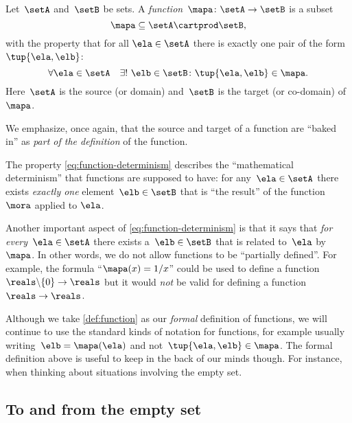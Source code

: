 \begin{ctdefinition}[Function]
    \label{def:function}
    Let~$\setA$ and~$\setB$ be sets.
    A \emph{function}~$\mapa\colon \setA \to \setB$ is a subset
    \begin{equation*}
        \mapa \subseteq \setA \cartprod \setB,
    \end{equation*}
    with the property that for all $\ela \in \setA$ there is exactly one pair of the form~$\tup{\ela,\elb}$:
    \begin{equation}
        \label{eq:function-determinism}
        \forall \ela \in \setA  \quad  \exists !
        \ \elb \in \setB \colon \tup{\ela,\elb} \in \mapa.
    \end{equation}
    Here~$\setA$ is the source (or domain) and~$\setB$ is the target (or co-domain) of~$\mapa$.
\end{ctdefinition}


We emphasize, once again, that the source and target of a function are ``baked in'' as \emph{part of the definition} of the function.

The property \cref{eq:function-determinism} describes the ``mathematical determinism'' that functions are supposed to have: for any~$\ela \in \setA$ there exists \emph{exactly one} element~$\elb \in \setB$ that is ``the result'' of the function $\mora$ applied to $\ela$.

Another important aspect of \cref{eq:function-determinism} is that it says that \emph{for every}~$\ela \in \setA$ there exists a~$\elb \in \setB$ that is related to~$\ela$ by $\mapa$.
In other words, we do not allow functions to be ``partially defined''.
For example, the formula ``$\mapa(x) = 1/x$'' could be used to define a function~$\reals \backslash \{ 0 \} \to \reals$ but it would \emph{not} be valid for defining a function~$\reals \to \reals$.

Although we take \cref{def:function} as our \emph{formal} definition of functions, we will continue to use the standard kinds of notation for functions, for example usually writing~$\elb = \mapa(\ela)$ and not~$\tup{\ela, \elb} \in \mapa$.
The formal definition above is useful to keep in the back of our minds though.
For instance, when thinking about situations involving the empty set.

\subsection{To and from the empty set}

